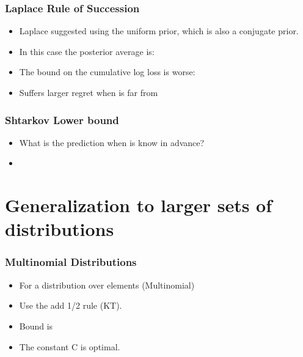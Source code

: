 \documentclass{beamer}
\begin{document}
\begin{frame}
\frametitle{Laplace Rule of Succession}
\begin{itemize}
\item
Laplace suggested using the uniform prior, which is also a conjugate prior.
\item In this case the posterior average is:
\R{\[
\frac{\int_0^1 \theta^{n+1} (1-\theta)^{t-n} d\theta}
{\int_0^1 \theta^{n} (1-\theta)^{t-n} d\theta}
=
\frac{n+1}{t+2}
\]}
\item
The bound on the cumulative log loss is worse:
\R{\[
\TAloss - \BEloss = \ln T + O(1)
\]}
\item
Suffers larger regret when \R{$\btheta$} is far from 
\end{itemize}
\end{frame}



\begin{frame}
\frametitle{Shtarkov Lower bound}
\begin{itemize}
\item What is the  prediction when  is know in
  advance?
\item
{}
\end{itemize}
\end{frame}

\section{Generalization to larger sets of distributions}

\begin{frame}
\frametitle{Multinomial Distributions}
\begin{itemize}
\item For a distribution over  elements (Multinomial) 
\item Use the add 1/2 rule (KT).
\R{\[
p(i) = \frac{n_i+1/2}{t+k/2}
\]}
\item Bound is
\item 
The constant C is optimal.
\end{itemize}
\end{frame}
\end{document}
